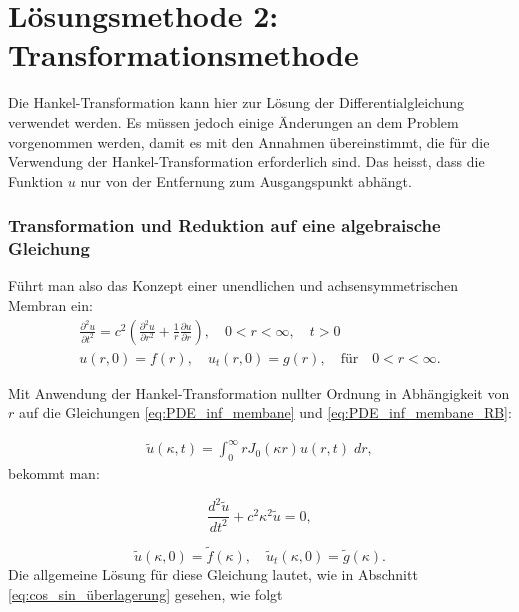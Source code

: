 %
%
%
\section{Lösungsmethode 2: Transformationsmethode
\label{kreismembran:section:teil3}}
Die Hankel-Transformation kann hier zur Lösung der Differentialgleichung verwendet werden. Es müssen jedoch einige Änderungen an dem Problem vorgenommen werden, damit es mit den Annahmen übereinstimmt, die für die Verwendung der Hankel-Transformation erforderlich sind. Das heisst, dass die Funktion $u$ nur von der Entfernung zum Ausgangspunkt abhängt. 

\subsubsection{Transformation und Reduktion auf eine algebraische Gleichung\label{subsub:transf_reduktion}}
Führt man also das Konzept einer unendlichen und achsensymmetrischen Membran ein:
\begin{align}
	\frac{\partial^2u}{\partial t^2}
	=
	c^2  \left(\frac{\partial^2 u}{\partial r^2}
	+
	\frac{1}{r}
	\frac{\partial u}{\partial r} \right), \quad 0<r<\infty, \quad t>0   \label{eq:PDE_inf_membane} \\
		u(r,0)=f(r), \quad u_t(r,0) = g(r), \quad \text{für} \quad 0<r<\infty.
	\label{eq:PDE_inf_membane_RB}
\end{align}


Mit Anwendung der Hankel-Transformation nullter Ordnung in Abhängigkeit von $r$ auf die Gleichungen \eqref{eq:PDE_inf_membane} und \eqref{eq:PDE_inf_membane_RB}:

\begin{align}
	\tilde{u}(\kappa,t)=\int_{0}^{\infty}r J_0(\kappa r)u(r,t) \; dr,
\end{align}
bekommt man:

\begin{equation*}
	\frac{d^2 \tilde{u}}{dt^2} + c^2\kappa^2\tilde{u}=0,
\end{equation*}

\begin{equation*}
	\tilde{u}(\kappa,0)=\tilde{f}(\kappa), \quad 
	\tilde{u}_t(\kappa,0)=\tilde{g}(\kappa).
\end{equation*}
Die allgemeine Lösung für diese Gleichung lautet, wie in Abschnitt \eqref{eq:cos_sin_überlagerung} gesehen, wie folgt

